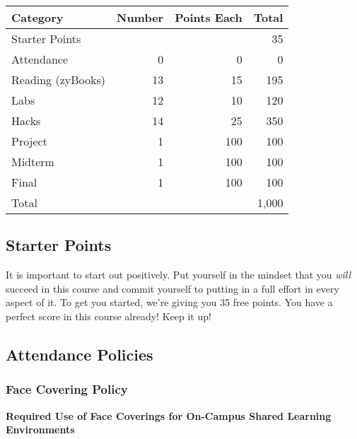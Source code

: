 \documentclass[12pt]{scrartcl}
\begin{document}
\begin{table}[h]
\centering



{\small
\setlength{\tabcolsep}{0.5em} %
\renewcommand{\arraystretch}{1.2}%

\begin{tabular}{lrrr}
\hline
\rowcolor{steelblue!50} Category & Number & Points Each & Total \\
\hline
\rowcolor{steelblue!5}  Starter Points    &    &     &  35 \\
\rowcolor{steelblue!10} Attendance        & 0  & 0   &   0 \\
\rowcolor{steelblue!5}  Reading (zyBooks) & 13 & 15  & 195 \\
\rowcolor{steelblue!10} Labs              & 12 & 10  & 120 \\
\rowcolor{steelblue!5}  Hacks             & 14 & 25  & 350 \\
\rowcolor{steelblue!10} Project           & 1  & 100 & 100 \\
\rowcolor{steelblue!5}  Midterm           & 1  & 100 & 100 \\
\rowcolor{steelblue!10} Final             & 1  & 100 & 100 \\
\hline
Total  & & & 1,000 
\end{tabular}
}
\end{table}


\subsection{Starter Points}

It is important to start out positively.  Put yourself in the mindset
that you \emph{will} succeed in this course and commit yourself to
putting in a full effort in every aspect of it.  To get you started,
we're giving you 35 free points.  You have a perfect score in this
course already!  Keep it up!

\subsection{Attendance Policies}

\subsubsection{Face Covering Policy}

\textbf{Required Use of Face Coverings for On-Campus Shared Learning Environments}
\end{document}
